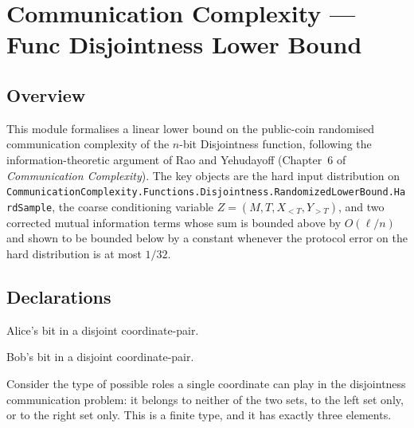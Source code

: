 \chapter{Communication Complexity --- Func Disjointness Lower Bound}
\section{Overview}

This module formalises a linear lower bound on the public-coin randomised communication
complexity of the $n$-bit Disjointness function, following the information-theoretic
argument of Rao and Yehudayoff (Chapter~6 of \emph{Communication Complexity}).
The key objects are the hard input distribution on \texttt{CommunicationComplexity.Functions.Disjointness.RandomizedLowerBound.HardSample},
the coarse conditioning variable $Z = (M, T, X_{<T}, Y_{>T})$, and two corrected mutual
information terms whose sum is bounded above by $O(\ell/n)$ and shown to be bounded below
by a constant whenever the protocol error on the hard distribution is at most $1/32$.

\section{Declarations}

\begin{definition}[Xbit]
\label{CommunicationComplexity.Functions.Disjointness.RandomizedLowerBound.DisjointCoordinate.xBit}
\leanok
Alice's bit in a disjoint coordinate-pair.
\end{definition}

\begin{definition}[Ybit]
\label{CommunicationComplexity.Functions.Disjointness.RandomizedLowerBound.DisjointCoordinate.yBit}
\leanok
Bob's bit in a disjoint coordinate-pair.
\end{definition}

\begin{theorem}
\label{CommunicationComplexity.Functions.Disjointness.RandomizedLowerBound.DisjointCoordinate.card}
\leanok
{}
Consider the type of possible roles a single coordinate can play in the disjointness
communication problem: it belongs to neither of the two sets, to the left set only, or
to the right set only. This is a finite type, and it has exactly three elements.
\end{theorem}

